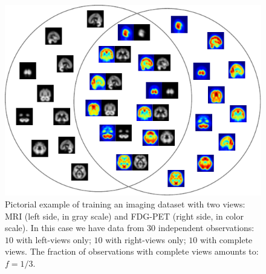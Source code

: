 \begin{figure}[!h]
\centering
\includegraphics[width=0.8\columnwidth]{./tex/fig/nimg_scheme.pdf}
\caption{
	Pictorial example of training an imaging dataset with two views: MRI (left side, in gray scale) and FDG-PET (right side, in color scale).
	In this case we have data from 30 independent observations:
	$10$ with left-views only; $10$ with right-views only; $10$ with complete views.
	The fraction of observations with complete views amounts to: $f = 1/3$.
}
\label{fig:nimg_scheme}
\end{figure}
%
